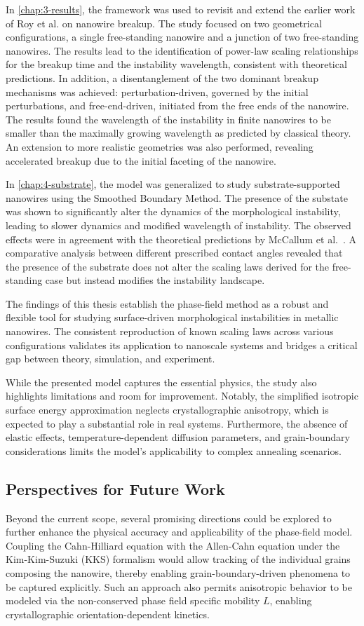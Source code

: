 In \autoref{chap:3-results}, the framework was used to revisit and extend the earlier work of Roy et al. on nanowire breakup. The study focused on two geometrical configurations, a single free-standing nanowire and a junction of two free-standing nanowires. The results lead to the identification of power-law scaling relationships for the breakup time and the instability wavelength, consistent with theoretical predictions. In addition, a disentanglement of the two dominant breakup mechanisms was achieved: perturbation-driven, governed by the initial perturbations, and free-end-driven, initiated from the free ends of the nanowire. The results found the wavelength of the instability in finite nanowires to be smaller than the maximally growing wavelength as predicted by classical theory. An extension to more realistic geometries was also performed, revealing accelerated breakup due to the initial faceting of the nanowire. 

In \autoref{chap:4-substrate}, the model was generalized to study substrate-supported nanowires using the Smoothed Boundary Method. The presence of the substate was shown to significantly alter the dynamics of the morphological instability, leading to slower dynamics and modified wavelength of instability. The observed effects were in agreement with the theoretical predictions by McCallum et al.~. A comparative analysis between different prescribed contact angles revealed that the presence of the substrate does not alter the scaling laws derived for the free-standing case but instead modifies the instability landscape. 

The findings of this thesis establish the phase-field method as a robust and flexible tool for studying surface-driven morphological instabilities in metallic nanowires. The consistent reproduction of known scaling laws across various configurations validates its application to nanoscale systems and bridges a critical gap between theory, simulation, and experiment.

While the presented model captures the essential physics, the study also highlights limitations and room for improvement. Notably, the simplified isotropic surface energy approximation neglects crystallographic anisotropy, which is expected to play a substantial role in real systems. Furthermore, the absence of elastic effects, temperature-dependent diffusion parameters, and grain-boundary considerations limits the model's applicability to complex annealing scenarios.

\subsection*{Perspectives for Future Work}
Beyond the current scope, several promising directions could be explored to further enhance the physical accuracy and applicability of the phase-field model. Coupling the Cahn-Hilliard equation with the Allen-Cahn equation under the Kim-Kim-Suzuki (KKS) formalism would allow tracking of the individual grains composing the nanowire, thereby enabling grain-boundary-driven phenomena to be captured explicitly. Such an approach also permits anisotropic behavior to be modeled via the non-conserved phase field specific mobility $L$, enabling crystallographic orientation-dependent kinetics.

